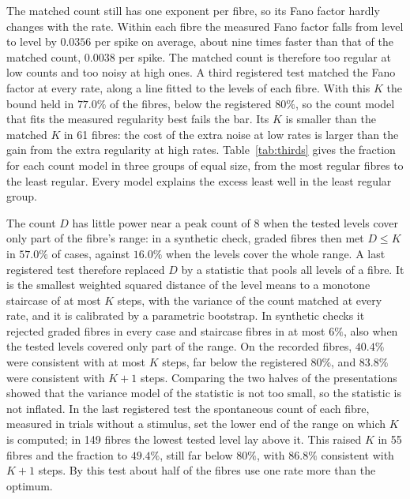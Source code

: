 The matched count still has one exponent per fibre, so its Fano factor hardly changes with the rate. Within each fibre the measured
Fano factor falls from level to level by $0.0356$ per spike on average, about nine times faster than that of the matched count,
$0.0038$ per spike. The matched count is therefore too regular at
low counts and too noisy at high ones. A third registered test matched the Fano factor at every rate, along a line fitted to the
levels of each fibre. With this $K$ the bound held in $77.0\%$ of the fibres, below the registered $80\%$, so the count model that fits
the measured regularity best fails the bar. Its $K$ is smaller than the matched $K$ in 61 fibres: the cost of the extra noise at low
rates is larger than the gain from the extra regularity at high rates. Table~\ref{tab:thirds} gives the fraction for each count model in
three groups of equal size, from the most regular fibres to the least regular. Every model explains the excess least well in the
least regular group.

The count $D$ has little power near a peak count of 8 when the tested levels cover only part of the fibre's range: in a synthetic
check, graded fibres then met $D\le K$ in $57.0\%$ of cases, against $16.0\%$ when the levels cover the whole range. A last registered test therefore replaced $D$ by a statistic that pools
all levels of a fibre. It is the smallest weighted squared distance of the level means to a monotone staircase of at most $K$ steps, with the
variance of the count matched at every rate, and it is calibrated by a parametric bootstrap. In synthetic checks it rejected graded
fibres in every case and staircase fibres in at most $6\%$, also when the tested levels covered only part of the range. On the
recorded fibres, $40.4\%$ were consistent with at most $K$ steps, far below the registered $80\%$, and $83.8\%$ were consistent with
$K+1$ steps. Comparing the two halves of the presentations showed that the variance model of the statistic is not too small, so the
statistic is not inflated. In the last registered test the spontaneous count of each fibre, measured in trials without a stimulus,
set the lower end of the range on which $K$ is computed; in 149 fibres the lowest tested level lay above it. This raised $K$ in 55
fibres and the fraction to $49.4\%$, still far below $80\%$, with $86.8\%$ consistent with $K+1$ steps. By this test about half of the
fibres use one rate more than the optimum.

